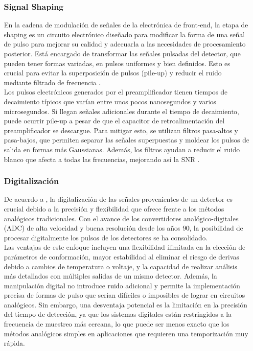 \documentclass[]{book}
\begin{document}
\subsubsection{Signal Shaping}

\noindent En la cadena de modulación de señales de la electrónica de front-end, la etapa de shaping es un circuito electrónico diseñado para modificar la forma de una señal de pulso para mejorar su calidad y adecuarla a las necesidades de procesamiento posterior. Está encargado de transformar las señales pulsadas del detector, que pueden tener formas variadas, en pulsos uniformes y bien definidos. Esto es crucial para evitar la superposición de pulsos (pile-up) y reducir el ruido mediante filtrado de frecuencia \cite{leo1994techniques}.\\

\noindent Los pulsos electrónicos generados por el preamplificador tienen tiempos de decaimiento típicos que varían entre unos pocos nanosegundos y varios microsegundos. Si llegan señales adicionales durante el tiempo de decaimiento, puede ocurrir pile-up a pesar de que el capacitor de retroalimentación del preamplificador se descargue. Para mitigar esto, se utilizan filtros pasa-altos y pasa-bajos, que permiten separar las señales superpuestas y moldear los pulsos de salida en formas más Gaussianas. Además, los filtros ayudan a reducir el ruido blanco que afecta a todas las frecuencias, mejorando así la SNR \cite{kolanoski2020particle}.\\

\subsubsection{Digitalización}

\noindent De acuerdo a \cite{knoll2010radiation}, la digitalización de las señales provenientes de un detector es crucial debido a la precisión y flexibilidad que ofrece frente a los métodos analógicos tradicionales. Con el avance de los convertidores analógico-digitales (ADC) de alta velocidad y buena resolución desde los años 90, la posibilidad de procesar digitalmente los pulsos de los detectores se ha consolidado.\\

\noindent Las ventajas de este enfoque incluyen una flexibilidad ilimitada en la elección de parámetros de conformación, mayor estabilidad al eliminar el riesgo de derivas debido a cambios de temperatura o voltaje, y la capacidad de realizar análisis más detallados con múltiples salidas de un mismo detector. Además, la manipulación digital no introduce ruido adicional y permite la implementación precisa de formas de pulso que serían difíciles o imposibles de lograr en circuitos analógicos. Sin embargo, una desventaja potencial es la limitación en la precisión del tiempo de detección, ya que los sistemas digitales están restringidos a la frecuencia de muestreo más cercana, lo que puede ser menos exacto que los métodos analógicos simples en aplicaciones que requieren una temporización muy rápida.\\
\end{document}
